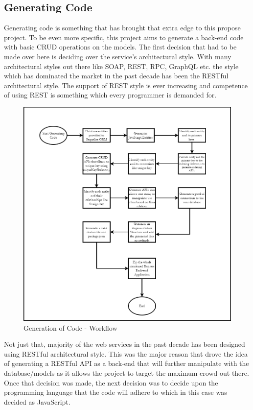 \documentclass[letterpaper, 10 pt, conference]{ieeeconf}
\begin{document}
\subsection{Generating Code}
Generating code is something that has brought that extra edge to this propose project. To be even more specific, this project aims to generate a back-end code with basic CRUD operations on the models. The first decision that had to be made over here is deciding over the service’s architectural style. With many architectural styles out there like SOAP, REST, RPC, GraphQL etc. the style which has dominated the market in the past decade has been the RESTful architectural style. The support of REST style is ever increasing and competence of using REST is something which every programmer is demanded for. 
\begin{figure}[h]
   \centering
   \includegraphics[scale=0.25]{./Code2.png}
   \caption{Generation of Code - Workflow}
   \label{fig:my_label}
\end{figure}
Not just that, majority of the web services in the past decade has been designed using RESTful architectural style. This was the major reason that drove the idea of generating a RESTful API as a back-end that will further manipulate with the database/models as it allows the project to target the maximum crowd out there. Once that decision was made, the next decision was to decide upon the programming language that the code will adhere to which in this case was decided as JavaScript.
\end{document}
